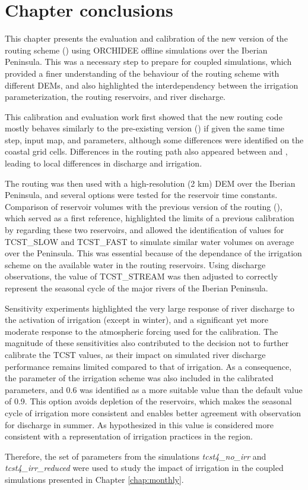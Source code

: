 \pagebreak

\section{Chapter conclusions}

This chapter presents the evaluation and calibration of the new version of the routing scheme (\native) using ORCHIDEE offline simulations over the Iberian Peninsula. This was a necessary step to prepare for coupled simulations, which provided a finer understanding of the behaviour of the routing scheme with different DEMs, and also highlighted the interdependency between the irrigation parameterization, the routing reservoirs, and river discharge. 

This calibration and evaluation work first showed that the new routing code mostly behaves similarly to the pre-existing version (\std) if given the same time step, input map, and parameters, although some differences were identified on the coastal grid cells. Differences in the routing path also appeared between \std and \native, leading to local differences in discharge and irrigation.

The \native routing was then used with a high-resolution (2 km) DEM over the Iberian Peninsula, and several options were tested for the reservoir time constants. 
Comparison of reservoir volumes with the previous version of the routing (\std), which served as a first reference, highlighted the limits of a previous calibration by \citet{kilic_evaluation_2023} regarding these two reservoirs, and allowed the identification of values for TCST\_SLOW and TCST\_FAST to simulate similar water volumes on average over the Peninsula. This was essential because of the dependance of the irrigation scheme on the available water in the routing reservoirs.
Using discharge observations, the value of TCST\_STREAM was then adjusted to correctly represent the seasonal cycle of the major rivers of the Iberian Peninsula.

Sensitivity experiments highlighted the very large response of river discharge to the activation of irrigation (except in winter), and a significant yet more moderate response to the atmospheric forcing used for the calibration. 
The magnitude of these sensitivities also contributed to the decision not to further calibrate the TCST values, as their impact on simulated river discharge performance remains limited compared to that of irrigation.
As a consequence, the \betairrig parameter of the irrigation scheme was also included in the calibrated parameters, and 0.6 was identified as a more suitable value than the default value of 0.9. This option avoids depletion of the reservoirs, which makes the seasonal cycle of irrigation more consistent and enables better agreement with observation for discharge in summer. As hypothesized in \citet{arboleda-obando_validation_2024} this value is considered more consistent with a representation of irrigation practices in the region.

Therefore, the set of parameters from the simulations \textit{tcst4\_no\_irr} and \textit{tcst4\_irr\_reduced} were used to study the impact of irrigation in the coupled simulations presented in Chapter \ref{chap:monthly}.
